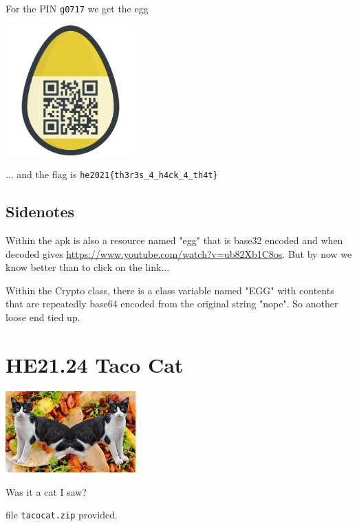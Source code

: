\documentclass[english,a4paper,nols,noindent]{tufte-handout}
\begin{document}
For the PIN \verb+g0717+ we get the egg 
\begin{marginfigure}
    \includegraphics[width=50mm]{ch23/solution23.png}
\end{marginfigure}

... and the flag is \verb+he2021{th3r3s_4_h4ck_4_th4t}+

\subsection{Sidenotes}

Within the apk is also a resource named "egg" that is
base32 encoded and when decoded gives
\url{https://www.youtube.com/watch?v=ub82Xb1C8os}.  But by now we know better
than to click on the link...

Within the Crypto class, there is a class variable named "EGG" with contents
that are repeatedly base64 encoded from the original string "nope".  So another
loose end tied up.

\hypertarget{he21.24}{%
  \section{HE21.24 Taco Cat}
  \label{he21.24}}
\begin{marginfigure}
    \includegraphics[width=50mm]{images/challenge24.jpg}
\end{marginfigure}

\noindent Was it a cat I saw?

file \verb+tacocat.zip+ provided.
\end{document}

